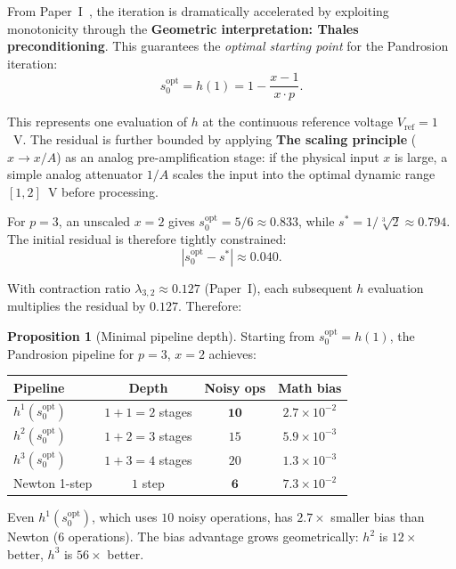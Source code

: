 \documentclass[11pt,a4paper]{article}
\theoremstyle{definition}
\newtheorem{proposition}{Proposition}[section]
\newcommand{\cbrt}[1]{\sqrt[3]{#1}}
\begin{document}
From Paper~I~\cite{besevic2026}, the iteration is dramatically accelerated by exploiting monotonicity through the \textbf{Geometric interpretation: Thales preconditioning}. This guarantees the \emph{optimal starting point} for the Pandrosion iteration:
\begin{equation}
  \label{eq:s0opt}
  s_0^{\mathrm{opt}} = h(1) = 1 - \frac{x-1}{x \cdot p}.
\end{equation}

This represents one evaluation of $h$ at the continuous reference voltage $V_{\text{ref}} = 1$~V. The residual is further bounded by applying \textbf{The scaling principle} ($x \to x/A$) as an analog pre-amplification stage: if the physical input $x$ is large, a simple analog attenuator $1/A$ scales the input into the optimal dynamic range $[1, 2]$~V before processing. 

For $p = 3$, an unscaled $x = 2$ gives $s_0^{\mathrm{opt}} = 5/6 \approx 0.833$, while $s^* = 1/\cbrt{2} \approx 0.794$.  The initial residual is therefore tightly constrained:
\[
  |s_0^{\mathrm{opt}} - s^*| \approx 0.040.
\]

With contraction ratio $\lambda_{3,2} \approx 0.127$ (Paper~I), each subsequent $h$ evaluation multiplies the residual by $0.127$.  Therefore:

\begin{proposition}[Minimal pipeline depth]
\label{prop:minimal}
Starting from $s_0^{\mathrm{opt}} = h(1)$, the Pandrosion pipeline for $p = 3$, $x = 2$ achieves:
\begin{center}
\begin{tabular}{lccc}
\toprule
\textbf{Pipeline} & \textbf{Depth} & \textbf{Noisy ops} & \textbf{Math bias} \\
\midrule
$h^1(s_0^{\mathrm{opt}})$ & $1 + 1 = 2$ stages & $\mathbf{10}$ & $2.7 \times 10^{-2}$ \\
$h^2(s_0^{\mathrm{opt}})$ & $1 + 2 = 3$ stages & $15$ & $5.9 \times 10^{-3}$ \\
$h^3(s_0^{\mathrm{opt}})$ & $1 + 3 = 4$ stages & $20$ & $1.3 \times 10^{-3}$ \\
\midrule
Newton 1-step & $1$ step & $\mathbf{6}$ & $7.3 \times 10^{-2}$ \\
\bottomrule
\end{tabular}
\end{center}
Even $h^1(s_0^{\mathrm{opt}})$, which uses $10$ noisy operations, has $2.7\times$ smaller bias than Newton ($6$ operations).  The bias advantage grows geometrically: $h^2$ is $12\times$ better, $h^3$ is $56\times$ better.
\end{proposition}
\end{document}
